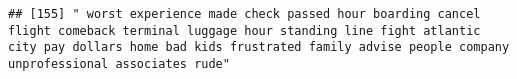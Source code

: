 \documentclass[
]{article}
\begin{document}
\begin{verbatim}
## [155] " worst experience made check passed hour boarding cancel flight comeback terminal luggage hour standing line fight atlantic city pay dollars home bad kids frustrated family advise people company unprofessional associates rude"                                                                                                                                                                                                                                                                                                                                                                                                                                                                                                                                                                                                                                                                                                                                                                                                                                                                                                                                                                                                                                                                                                                                                                                                                                                                                                                                                                                                                                                                                                                                                             

\end{verbatim}
\end{document}
